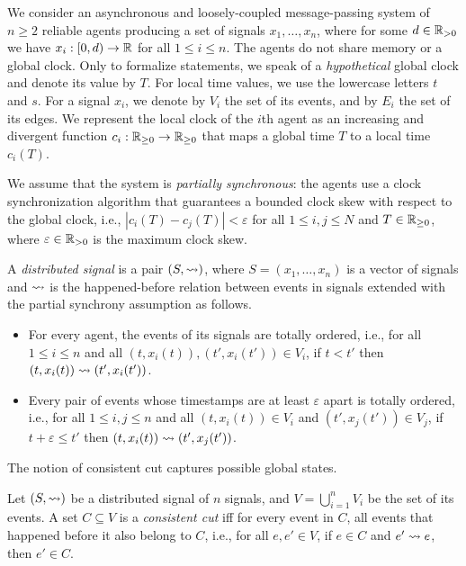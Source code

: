 We consider an asynchronous and loosely-coupled message-passing system of $n \geq 2$ reliable agents producing a set of signals $x_1, \ldots, x_n$, where for some $d \in \mathbb{R}_{> 0}$ we have $x_i : [0,d) \to \mathbb{R}$ for all $1 \leq i \leq n$.
%
The agents do not share memory or a global clock.
%
Only to formalize statements, we speak of a \emph{hypothetical} global clock and denote its value by $T$.
%
For local time values, we use the lowercase letters $t$ and $s$.
For a signal $x_i$, we denote by $V_i$ the set of its events, and by $E_i$ the set of its edges.
%
We represent the local clock of the $i$th agent as an increasing and divergent function $c_i : 
\mathbb{R}_{\geq 0} \to \mathbb{R}_{\geq 0}$ that maps a global time $T$ to a local time $c_i(T)$.

We assume that the system is \emph{partially synchronous}: the agents use a clock synchronization algorithm that guarantees a bounded clock skew with respect to the global clock, i.e., $|c_i(T) - c_j(T)| < \varepsilon$ for all $1 \leq i,j \leq N$ and $T \in \mathbb{R}_{\geq 0}$, where $\varepsilon \in \mathbb{R}_{> 0}$ is the maximum clock skew.

\begin{definition} \label{defn:hb}
	A \emph{distributed signal} is a pair $(S, {\rightsquigarrow})$, where $S = (x_1, \ldots, x_n)$ is a vector of 
	signals and ${\rightsquigarrow}$ is the happened-before relation between events in signals extended with the 
	partial synchrony assumption as follows.
	\begin{itemize}
		\item For every agent, the events of its signals are totally ordered, i.e., for all $1 \leq i \leq n$ and all $(t, x_i(t)), (t', x_i(t')) \in V_i$, if $t < t'$ then $(t, x_i(t)) \rightsquigarrow (t', x_i(t'))$.
		\item Every pair of events whose timestamps are at least $\varepsilon$ apart is totally ordered, i.e., for all $1 \leq i,j \leq n$ and all $(t, x_i(t)) \in V_i$ and $(t', x_j(t')) \in V_j$, if $t + \varepsilon \leq t'$ then $(t, x_i(t)) \rightsquigarrow (t', x_j(t'))$.
	\end{itemize}
\end{definition}

The notion of consistent cut captures possible global states.

\begin{definition}
	Let $(S, {\rightsquigarrow})$ be a distributed signal of $n$ signals, and $V = \bigcup_{i = 1}^{n} V_i$ be the set of its events.
	A set $C \subseteq V$ is a \emph{consistent cut} iff for every event in $C$, all events that happened before  it also belong to $C$, i.e., for all $e, e' \in V$, if $e \in C$ and $e' \rightsquigarrow e$, then $e' \in C$.
\end{definition}

